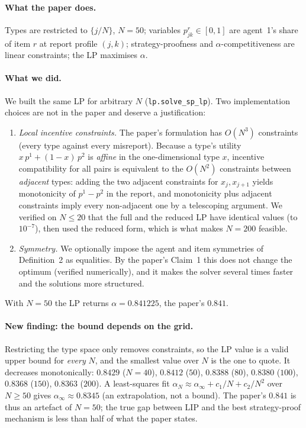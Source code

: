 \documentclass{article}
\begin{document}
\paragraph{What the paper does.} Types are restricted to $\{j/N\}$, $N=50$; variables
$p^r_{jk}\in[0,1]$ are agent~1's share of item $r$ at report profile $(j,k)$; strategy-proofness
and $\alpha$-competitiveness are linear constraints; the LP maximises $\alpha$.

\paragraph{What we did.} We built the same LP for arbitrary $N$ (\texttt{lp.solve\_sp\_lp}). Two
implementation choices are not in the paper and deserve a justification:
\begin{enumerate}
\item \emph{Local incentive constraints.} The paper's formulation has $O(N^3)$ constraints (every
  type against every misreport). Because a type's utility $x\,p^1+(1-x)\,p^2$ is \emph{affine}
  in the one-dimensional type $x$, incentive compatibility for all pairs is equivalent to the
  $O(N^2)$ constraints between \emph{adjacent} types: adding the two adjacent constraints for
  $x_j,x_{j+1}$ yields monotonicity of $p^1-p^2$ in the report, and monotonicity plus adjacent
  constraints imply every non-adjacent one by a telescoping argument. We verified on
  $N\le20$ that the full and the reduced LP have identical values (to $10^{-7}$), then used the
  reduced form, which is what makes $N=200$ feasible.
\item \emph{Symmetry.} We optionally impose the agent and item symmetries of Definition~2 as
  equalities. By the paper's Claim~1 this does not change the optimum (verified numerically),
  and it makes the solver several times faster and the solutions more structured.
\end{enumerate}
With $N=50$ the LP returns $\alpha=0.841225$, the paper's $0.841$.

\paragraph{New finding: the bound depends on the grid.} Restricting the type space only
removes constraints, so the LP value is a valid upper bound for \emph{every} $N$, and the
smallest value over $N$ is the one to quote. It decreases monotonically:
$0.8429$ ($N=40$), $0.8412$ ($50$), $0.8388$ ($80$), $0.8380$ ($100$), $0.8368$ ($150$),
$0.8363$ ($200$). A least-squares fit $\alpha_N\approx\alpha_\infty+c_1/N+c_2/N^2$ over $N\ge50$
gives $\alpha_\infty\approx0.8345$ (an extrapolation, not a bound). The paper's $0.841$ is thus
an artefact of $N=50$; the true gap between LIP and the best strategy-proof mechanism is less
than half of what the paper states.
\end{document}
